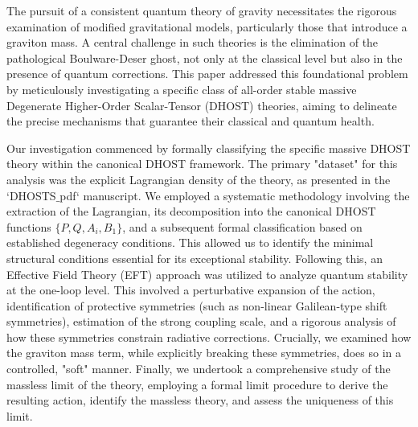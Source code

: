 \documentclass[twocolumn]{aastex631}
\begin{document}
The pursuit of a consistent quantum theory of gravity necessitates the rigorous examination of modified gravitational models, particularly those that introduce a graviton mass. A central challenge in such theories is the elimination of the pathological Boulware-Deser ghost, not only at the classical level but also in the presence of quantum corrections. This paper addressed this foundational problem by meticulously investigating a specific class of all-order stable massive Degenerate Higher-Order Scalar-Tensor (DHOST) theories, aiming to delineate the precise mechanisms that guarantee their classical and quantum health.

Our investigation commenced by formally classifying the specific massive DHOST theory within the canonical DHOST framework. The primary "dataset" for this analysis was the explicit Lagrangian density of the theory, as presented in the `DHOSTS\ensuremath{\_}pdf` manuscript. We employed a systematic methodology involving the extraction of the Lagrangian, its decomposition into the canonical DHOST functions $\{P, Q, A_i, B_1\}$, and a subsequent formal classification based on established degeneracy conditions. This allowed us to identify the minimal structural conditions essential for its exceptional stability. Following this, an Effective Field Theory (EFT) approach was utilized to analyze quantum stability at the one-loop level. This involved a perturbative expansion of the action, identification of protective symmetries (such as non-linear Galilean-type shift symmetries), estimation of the strong coupling scale, and a rigorous analysis of how these symmetries constrain radiative corrections. Crucially, we examined how the graviton mass term, while explicitly breaking these symmetries, does so in a controlled, "soft" manner. Finally, we undertook a comprehensive study of the massless limit of the theory, employing a formal limit procedure to derive the resulting action, identify the massless theory, and assess the uniqueness of this limit.
\end{document}
